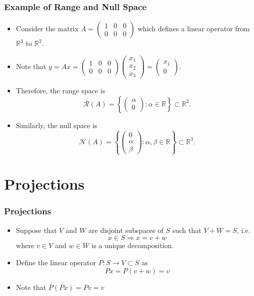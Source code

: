 \documentclass{beamer}
\begin{document}
\begin{frame}\frametitle{Example of Range and Null Space}
\begin{itemize}
\item Consider the matrix $A=\begin{pmatrix} 1 & 0 & 0\\ 0 & 0 & 0 \end{pmatrix}$ which defines a linear operator from $\mathbb{R}^3$ to $\mathbb{R}^2$.
\item Note that $y=Ax = 	\begin{pmatrix} 1 & 0 & 0 \\ 0 & 0 & 0 \end{pmatrix}\begin{pmatrix} x_1 \\ x_2 \\ x_3 \end{pmatrix} = \begin{pmatrix} x_1 \\ 0 \end{pmatrix}$.
\item Therefore, the range space is
	\[
	\mathcal{R}(A) = \left\{\begin{pmatrix}\alpha \\ 0 \end{pmatrix} : \alpha\in\mathbb{R} \right\} \subset \mathbb{R}^2.
	\]
\item Similarly, the null space is
	\[
	\mathcal{N}(A) = \left\{\begin{pmatrix}0 \\ \alpha \\ \beta \end{pmatrix} : \alpha, \beta\in\mathbb{R} \right\}\subset \mathbb{R}^3.
	\]
\end{itemize}
\end{frame}

\section{Projections}
\frame{\sectionpage}

\begin{frame}\frametitle{Projections}
\begin{itemize}

\item Suppose that $V$ and $W$ are disjoint subspaces of $S$ such that $V + W = S$, i.e.
\[ x \in S \Rightarrow x = v + w\]
where $v \in V$ and $w \in W$ is a unique decomposition.

\item Define the linear operator $P:S\to V \subset S$ as 
\[ Px = P(v+w) = v \]

\item Note that $P(Px) = Pv = v$
\end{itemize}
	
\end{frame}
\end{document}
